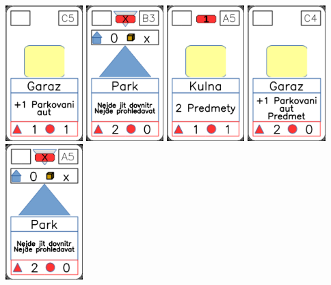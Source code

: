 \documentclass[a4paper]{article}
\begin{document}
	\includegraphics[width=3.0cm]{img-2_14}
	\includegraphics[width=3.0cm]{img-3_22}
	\includegraphics[width=3.0cm]{img-2_19}
	\includegraphics[width=3.0cm]{img-2_13}
	\includegraphics[width=3.0cm]{img-3_19}
\end{document}
